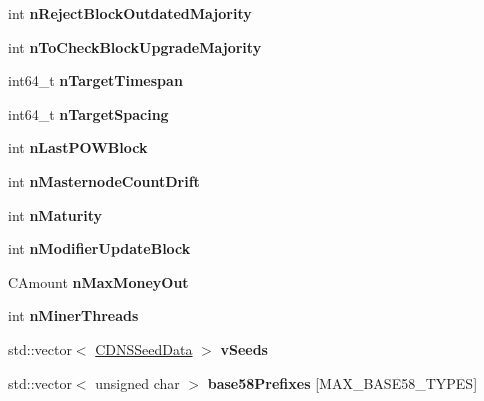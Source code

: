 \begin{DoxyCompactItemize}
int {\bfseries n\+Reject\+Block\+Outdated\+Majority}
\item 
\mbox{\label{class_c_chain_params_a7439dfd29226ebef8dfcb9a1afc733ff}} 
int {\bfseries n\+To\+Check\+Block\+Upgrade\+Majority}
\item 
\mbox{\label{class_c_chain_params_ae3b007501adc348636d1107c10c72e41}} 
int64\+\_\+t {\bfseries n\+Target\+Timespan}
\item 
\mbox{\label{class_c_chain_params_a45a8d931326b48a91df0762bce9a2f97}} 
int64\+\_\+t {\bfseries n\+Target\+Spacing}
\item 
\mbox{\label{class_c_chain_params_a1376cb171648b51385a44fe0b30a5b4b}} 
int {\bfseries n\+Last\+P\+O\+W\+Block}
\item 
\mbox{\label{class_c_chain_params_ae2d0255279f57ab4b6e61b1031ca4d39}} 
int {\bfseries n\+Masternode\+Count\+Drift}
\item 
\mbox{\label{class_c_chain_params_a15482c3ec35d6748a8026bfee288728c}} 
int {\bfseries n\+Maturity}
\item 
\mbox{\label{class_c_chain_params_a22eb28020f13dd6df96158abcb227b25}} 
int {\bfseries n\+Modifier\+Update\+Block}
\item 
\mbox{\label{class_c_chain_params_a654ff32ca59e910f589b5acad4110ba2}} 
C\+Amount {\bfseries n\+Max\+Money\+Out}
\item 
\mbox{\label{class_c_chain_params_a3efbcec19f3883c8300063ec0acf4a35}} 
int {\bfseries n\+Miner\+Threads}
\item 
\mbox{\label{class_c_chain_params_a9ce50b4162fb2ebf5bd72ad4045aa70c}} 
std\+::vector$<$ \mbox{\hyperlink{struct_c_d_n_s_seed_data}{C\+D\+N\+S\+Seed\+Data}} $>$ {\bfseries v\+Seeds}
\item 
\mbox{\label{class_c_chain_params_a923d956c5d3891d0c682b7ef5410ed8f}} 
std\+::vector$<$ unsigned char $>$ {\bfseries base58\+Prefixes} \mbox{[}M\+A\+X\+\_\+\+B\+A\+S\+E58\+\_\+\+T\+Y\+P\+ES\mbox{]}

\end{DoxyCompactItemize}
